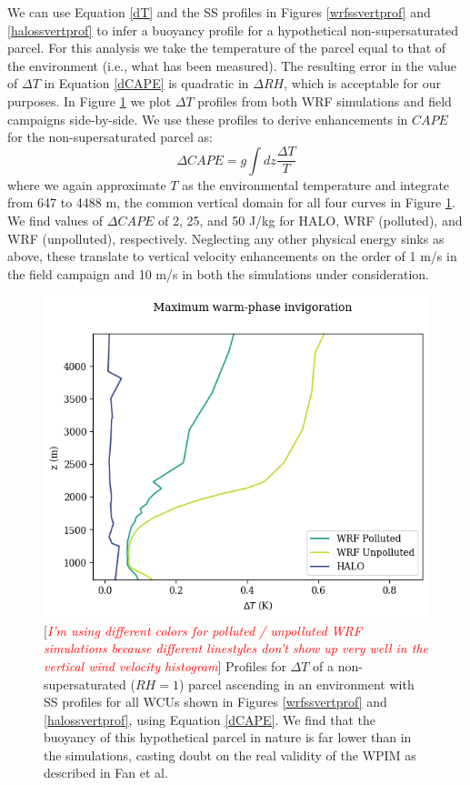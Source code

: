\documentclass{article}
\newcommand{\klcomm}[1]{\textcolor{red}{\textit{#1}}}
\begin{document}
We can use Equation \ref{dT} and the SS profiles in Figures \ref{wrfssvertprof} and \ref{halossvertprof} to infer a buoyancy profile for a hypothetical non-supersaturated parcel. For this analysis we take the temperature of the parcel equal to that of the environment (i.e., what has been measured). The resulting error in the value of $\Delta T$ in Equation \ref{dCAPE} is quadratic in $\Delta RH$, which is acceptable for our purposes. In Figure \ref{dTprofiles} we plot $\Delta T$ profiles from both WRF simulations and field campaigns side-by-side. We use these profiles to derive enhancements in $CAPE$ for the non-supersaturated parcel as:
\begin{equation}
\label{dCAPE}
\Delta CAPE = g \int dz \frac{\Delta T}{T}
\end{equation}
where we again approximate $T$ as the environmental temperature and integrate from 647 to 4488 m, the common vertical domain for all four curves in Figure \ref{dTprofiles}. We find values of $\Delta CAPE$ of 2, 25, and 50 J/kg for HALO, WRF (polluted), and WRF (unpolluted), respectively. Neglecting any other physical energy sinks as above, these translate to vertical velocity enhancements on the order of 1 m/s in the field campaign and 10 m/s in both the simulations under consideration.

\begin{figure}[ht]
    \centering
    \includegraphics[width=12cm]{wrf/combined_dT_profile_figure.png}
    \caption{[\klcomm{I'm using different colors for polluted / unpolluted WRF simulations because different linestyles don't show up very well in the vertical wind velocity histogram}] Profiles for $\Delta T$ of a non-supersaturated ($RH=1$) parcel ascending in an environment with SS profiles for all WCUs shown in Figures \ref{wrfssvertprof} and \ref{halossvertprof}, using Equation \ref{dCAPE}. We find that the buoyancy of this hypothetical parcel in nature is far lower than in the simulations, casting doubt on the real validity of the WPIM as described in Fan et al.}
    \label{dTprofiles}
\end{figure}
\end{document}
